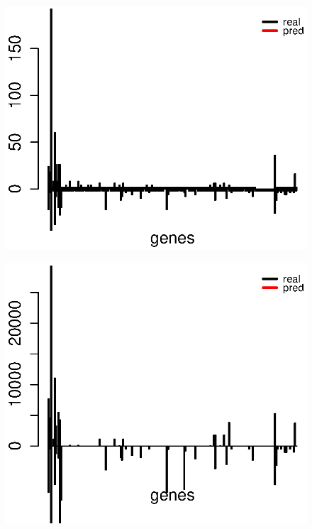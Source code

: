 \begin{figure} 
\noindent\begin{minipage}{.5\textwidth}
\centering
  \includegraphics[width=1\linewidth]{degree_barplot.eps}
  \label{fig:degree}
\end{minipage}
\noindent\begin{minipage}{.5\textwidth}
  \includegraphics[width=1\linewidth]{between_barplot.eps}
  \label{fig:between}
\end{minipage}
\end{figure}


